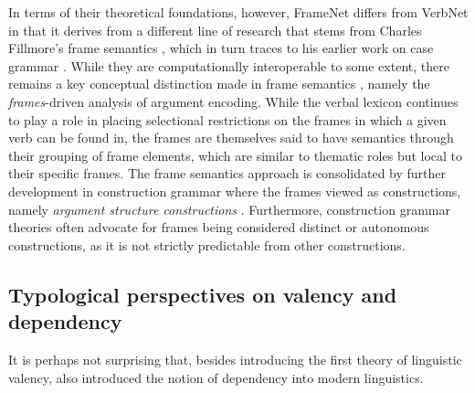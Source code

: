 In terms of their theoretical foundations, however, FrameNet differs from VerbNet in that it derives from a different line of research that stems from Charles Fillmore's frame semantics \citep{fillmore1977, fillmore1977a, fillmore1982}, which in turn traces to his earlier work on case grammar \citep{fillmore1968,fillmore1970}. While they are computationally interoperable to some extent, there remains a key conceptual distinction made in frame semantics \citet{fillmore1968}, namely the \textit{frames}-driven analysis of argument encoding. While the verbal lexicon continues to play a role in placing selectional restrictions on the frames in which a given verb can be found in, the frames are themselves said to have semantics through their grouping of frame elements, which are similar to thematic roles but local to their specific frames. The frame semantics approach is consolidated by further development in construction grammar where the frames viewed as constructions, namely \textit{argument structure constructions} \citep{goldberg1992,goldberg1995}. Furthermore, construction grammar theories often advocate for frames being considered distinct or autonomous constructions, as it is not strictly predictable from other constructions.


\subsection{Typological perspectives on valency and dependency}\label{subsec:typology}

It is perhaps not surprising that, besides introducing the first theory of linguistic valency, \citet{tesniere1959} also introduced the notion of dependency into modern linguistics.

